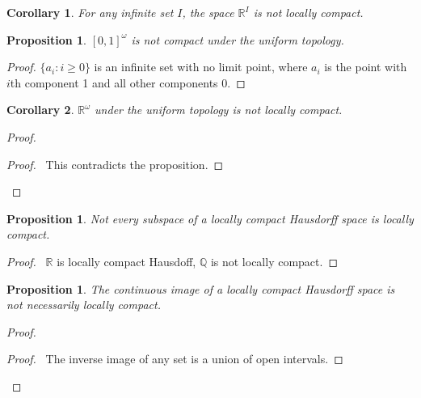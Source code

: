 \documentclass{report}
\let\qed\relax
\newtheorem{prop}[lm]{Proposition}
\newtheorem{cor}{Corollary}[lm]
\theoremstyle{definition}
\begin{document}
 \begin{cor}
 	For any infinite set $I$, the space $\mathbb{R}^I$ is not locally compact.
 \end{cor}

  \begin{prop}
   $[0,1]^\omega$ is not compact under the uniform topology.
 \end{prop}

 \begin{proof}
   \pf $\{ a_i : i \geq 0 \}$ is an infinite set with no limit point, where
$a_i$ is the point with $i$th component 1 and all other components 0. \qed
 \end{proof}

 \begin{cor}
   $\mathbb{R}^\omega$ under the uniform topology is not locally compact.
 \end{cor}

 \begin{proof}
  \pf
  \qedstep
  \begin{proof}
    \pf\ This contradicts the proposition.
  \end{proof}
  \qed
 \end{proof}

 \begin{prop}
   Not every subspace of a locally compact Hausdorff space is locally compact.
 \end{prop}

 \begin{proof}
   \pf\ $\mathbb{R}$ is locally compact Hausdoff, $\mathbb{Q}$ is not locally compact. \qed
 \end{proof}

 \begin{prop}
   The continuous image of a locally compact Hausdorff space is not necessarily locally compact.
 \end{prop}

 \begin{proof}
   \pf
   \begin{proof}
     \pf\ The inverse image of any set is a union of open intervals.
   \end{proof}
   \qed
 \end{proof}
\end{document}
